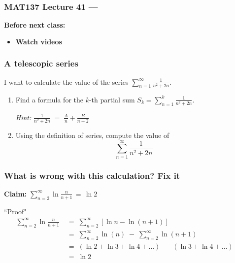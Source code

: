 \documentclass[14pt]{beamer}
\date{}
\title{}
\author{}
\newcommand{\setsize}[1]{\fontsize{#1}{#1}\selectfont} %
\newcommand{\smallerfont}{\setsize{13}} %
\newcommand{\vv}{\vspace{.5cm}}
\begin{document}
\begin{frame}
	\frametitle{MAT137 Lecture 41 --- }

	\vfill
	{\bf Before next class:}
		\begin{itemize} \normalsize
			\item {\bf Watch videos}
		\end{itemize}
\end{frame}

	\begin{frame}[t]
		\smallerfont
		\frametitle{A telescopic series}
		I want to calculate the value of the series \; ${\displaystyle  \sum_{n=1}^{\infty} \frac{1}{n^{2}+2n}. }$
		\vv
		\begin{enumerate}
			\item Find a formula for the $k$-th partial sum ${\displaystyle  S_k = \sum_{n=1}^{k} \frac{1}{n^{2}+2n}. }$

				\emph{Hint:} \; ${\displaystyle \frac{1}{n^{2}+2n} \; = \; \frac{A}{n} + \frac{B}{n+2} }$
				\vv

			\item Using the definition of series, compute the value of
				\[
					\sum_{n=1}^{\infty}\frac{1}{n^{2}+2n}
				\]
		\end{enumerate}
	\end{frame}
	\begin{frame}[t]
		\smallerfont
		\frametitle{What is wrong with this calculation? Fix it}

		{\bf Claim:} \;
		${\displaystyle \sum_{n=2}^{\infty} \ln \frac{n}{n+1} \, =\, \ln 2}$

		\begin{block}{``Proof"}
			\vspace{-.4cm}
			\begin{align*}
				\sum_{n=2}^{\infty}\ln \frac{n}{n+1}\; & = \; \sum_{n=2}^{\infty}\left[ \ln{n}- \ln(n+1) \right]                                             \\
				\;                                     & = \; \sum_{n=2}^{\infty}\ln (n) \; - \; \sum_{n=2}^{\infty}\ln (n+1)                                \\
				\;                                     & = \; \left( \ln 2 + \ln 3 + \ln 4 + \ldots \right) \; - \; ( \ln 3 + \ln 4 + \ldots) \phantom{\int} \\
				\;                                     & = \; \ln 2
			\end{align*}
		\end{block}
	\end{frame}
\end{document}
